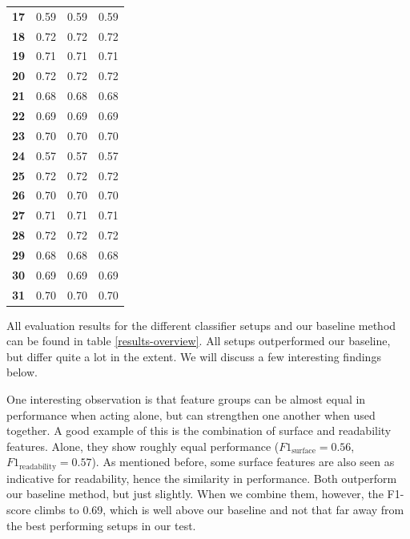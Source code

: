 \documentclass[
10pt, %
a4paper, %
oneside, %
headinclude,footinclude, %
] {book}%
\begin{document}
\begin{table}[]
\begin{tabular}{@{}llll@{}}
\textbf{17}        & 0.59                   & 0.59                & 0.59              \\
\textbf{18}       & 0.72                   & 0.72                & 0.72              \\
\textbf{19}       & 0.71                   & 0.71                & 0.71              \\
\textbf{20}       & 0.72                   & 0.72                & 0.72              \\
\textbf{21}       & 0.68                   & 0.68                & 0.68              \\
\textbf{22}       & 0.69                   & 0.69                & 0.69              \\
\textbf{23}       & 0.70                   & 0.70                & 0.70              \\
\textbf{24}       & 0.57                   & 0.57                & 0.57              \\

\textbf{25}       & 0.72                   & 0.72                & 0.72              \\
\textbf{26}       & 0.70                   & 0.70                & 0.70              \\
\textbf{27}       & 0.71                   & 0.71                & 0.71              \\
\textbf{28}       & 0.72                   & 0.72                & 0.72              \\
\textbf{29}       & 0.68                   & 0.68                & 0.68              \\
\textbf{30}       & 0.69                   & 0.69                & 0.69              \\
\textbf{31}       & 0.70                   & 0.70                & 0.70              \\ \bottomrule
\end{tabular}
\end{table}

All evaluation results for the different classifier setups and our baseline method can be found in table \ref{results-overview}. All setups outperformed our baseline, but differ quite a lot in the extent. We will discuss a few interesting findings below.

One interesting observation is that feature groups can be almost equal in performance when acting alone, but can strengthen one another when used together. A good example of this is the combination of surface and readability features. Alone, they show roughly equal performance ($F1_{\text{surface}} = 0.56$,  $F1_{\text{readability}} = 0.57$). As mentioned before, some surface features are also seen as indicative for readability, hence the similarity in performance. Both outperform our baseline method, but just slightly. When we combine them, however, the F1-score climbs to 0.69, which is well above our baseline and not that far away from the best performing setups in our test.
\end{document}
